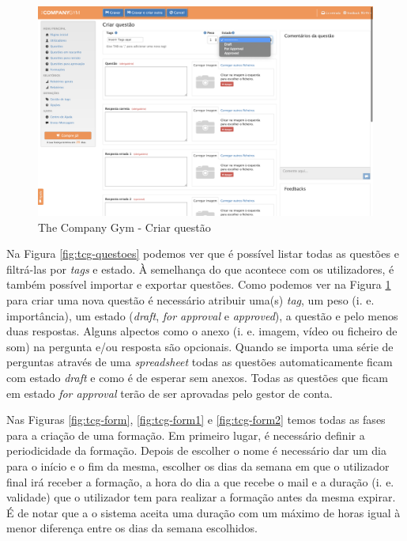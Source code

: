 \begin{figure}[ht!]
	\begin{center}
		\includegraphics[width=1\textwidth]{img/tcg/tcg-criar-questao.png}
		\caption{The Company Gym - Criar questão}
		\label{fig:tcg-criar-questoes}
	\end{center}
\end{figure}

Na Figura \ref{fig:tcg-questoes} podemos ver que é possível listar todas as questões e filtrá-las por \textit{tags} e estado. À semelhança do que acontece com os utilizadores, é também possível importar e exportar questões. Como podemos ver na Figura \ref{fig:tcg-criar-questoes} para criar uma nova questão é necessário atribuir uma(s) \textit{tag}, um peso (i. e. importância), um estado (\textit{draft}, \textit{for approval} e \textit{approved}), a questão e pelo menos duas respostas. Alguns alpectos como o anexo (i. e. imagem, vídeo ou ficheiro de som) na pergunta e/ou resposta são opcionais. Quando se importa uma série de perguntas através de uma \textit{spreadsheet} todas as questões automaticamente ficam com estado \textit{draft} e como é de esperar sem anexos. Todas as questões que ficam em estado \textit{for approval} terão de ser aprovadas pelo gestor de conta.


Nas Figuras \ref{fig:tcg-form}, \ref{fig:tcg-form1} e \ref{fig:tcg-form2} temos todas as fases para a criação de uma formação. Em primeiro lugar, é necessário definir a periodicidade da formação.  Depois de escolher o nome é necessário dar um dia para o início e o fim da mesma, escolher os dias da semana em que o utilizador final irá receber a formação, a hora do dia a que recebe o mail e a duração (i. e. validade) que o utilizador tem para realizar a formação antes da mesma expirar. É de notar que a o sistema aceita uma duração com um máximo de horas igual à menor diferença entre os dias da semana escolhidos.

